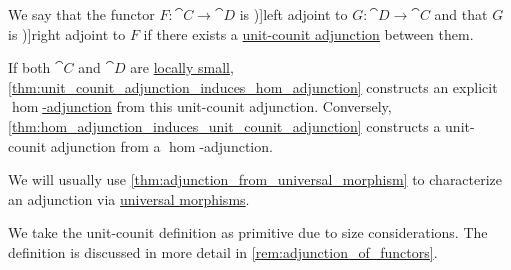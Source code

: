 \begin{definition}\label{def:adjoint_functor}\mimprovised
  We say that the functor \( F: \cat{C} \to \cat{D} \) is \term[en=left adjoint (\cite[79]{MacLane1998CategoryTheory})]{left adjoint} to \( G: \cat{D} \to \cat{C} \) and that \( G \) is \term[en=right adjoint (\cite[79]{MacLane1998CategoryTheory})]{right adjoint} to \( F \) if there exists a \hyperref[def:unit_counit_adjunction]{unit-counit adjunction} between them.

  If both \( \cat{C} \) and \( \cat{D} \) are \hyperref[def:small_category]{locally small}, \cref{thm:unit_counit_adjunction_induces_hom_adjunction} constructs an explicit \hyperref[def:hom_adjunction]{\( \hom \)-adjunction} from this unit-counit adjunction. Conversely, \cref{thm:hom_adjunction_induces_unit_counit_adjunction} constructs a unit-counit adjunction from a \( \hom \)-adjunction.

  We will usually use \cref{thm:adjunction_from_universal_morphism} to characterize an adjunction via \hyperref[def:universal_morphism]{universal morphisms}.
\end{definition}
\begin{comments}
  \item We take the unit-counit definition as primitive due to size considerations. The definition is discussed in more detail in \cref{rem:adjunction_of_functors}.
\end{comments}

